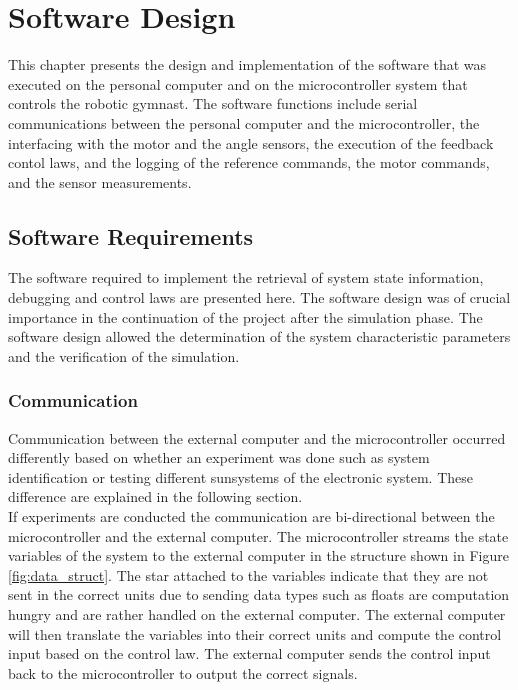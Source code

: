 \chapter{Software Design}
\label{chp:software_design}
This chapter presents the design and implementation of the software that was executed on the personal computer and on the microcontroller system that controls the robotic gymnast. The software functions include serial communications between the personal computer and the microcontroller, the interfacing with the motor and the angle sensors, the execution of the feedback contol laws, and the logging of the reference commands, the motor commands, and the sensor measurements.
\section{Software Requirements}
\label{sec:software_requirements}
The software required to implement the retrieval of system state information, debugging and control laws are presented here. The software design was of crucial importance in the continuation of the project after the simulation phase. The software design allowed the determination of the system characteristic parameters and the verification of the simulation.

\subsection{Communication}

Communication between the external computer and the microcontroller occurred differently based on whether an experiment was done such as system identification or testing different sunsystems of the electronic system. These difference are explained in the following section.\\

If experiments are conducted the communication are bi-directional between the microcontroller and the external computer. The microcontroller streams the state variables of the system to the external computer in the structure shown in Figure \ref{fig:data_struct}. The star attached to the variables indicate that they are not sent in the correct units due to sending data types such as floats are computation hungry and are rather handled on the external computer. The external computer will then translate the variables into their correct units and compute the control input based on the control law. The external computer sends the control input back to the microcontroller to output the correct signals.\\

